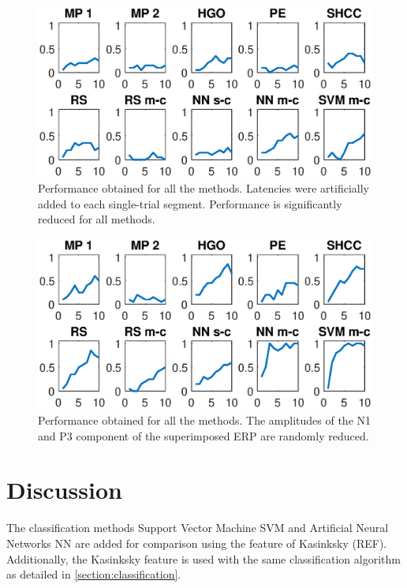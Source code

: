 \documentclass[sensors,article,submit,moreauthors,pdftex,10pt,a4paper]{mdpi}
\begin{document}
\begin{figure}[H]
\centering
\includegraphics[width=15cm]{images/PerformanceTestLatency.eps}
\caption{Performance obtained for all the methods.  Latencies were artificially added to each single-trial segment.  Performance is significantly reduced for all methods.}
\label{fig:performancetestlatency}
\end{figure}


\begin{figure}[H]
\centering
\includegraphics[width=15cm]{images/PerformanceTestAmplitude.eps}
\caption{Performance obtained for all the methods.  The amplitudes of the N1 and P3 component of the superimposed ERP are randomly reduced.}
\label{fig:performancetestamplitude}
\end{figure}


\section{Discussion}

The classification methods Support Vector Machine SVM and Artificial Neural Networks NN are added for comparison using the feature of Kasinksky (REF).  Additionally, the Kasinksky feature is used with the same classification algorithm as detailed in \ref{section:classification}.
\end{document}
